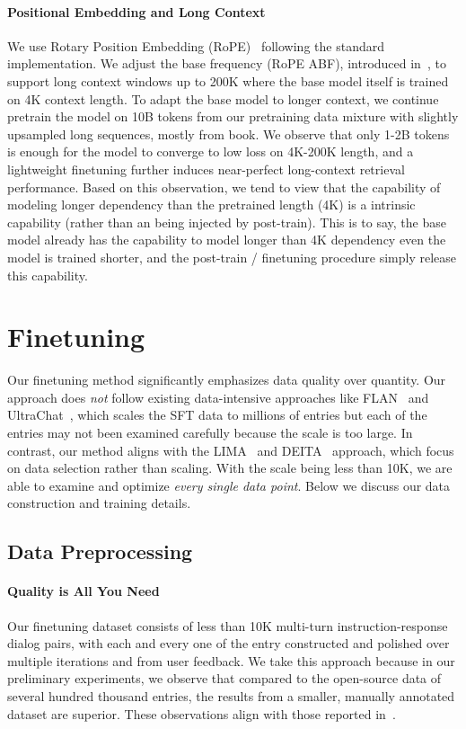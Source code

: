 \documentclass[numbers,sort&compress]{article}
\begin{document}
\paragraph{Positional Embedding and Long Context}

We use Rotary Position Embedding 
 (RoPE)~\citep{su2021roformer} following the standard implementation.
We adjust the base frequency (RoPE ABF), introduced in~\citet{xiong2023effective}, to support long context windows up to 200K where the base model itself is trained on 4K context length. 
To adapt the base model to longer context, we continue pretrain the model on 10B tokens from our pretraining data mixture with slightly upsampled long sequences, mostly from book. 
We observe that only 1-2B tokens is enough for the model to converge to low loss on 4K-200K length, and a lightweight finetuning further induces near-perfect long-context retrieval performance. 
Based on this observation, we tend to view that the capability of modeling longer dependency than the pretrained length (4K) is a intrinsic capability (rather than an being injected by post-train).
This is to say, the base model already has the capability to model longer than 4K dependency even the model is trained shorter, and the post-train / finetuning procedure simply release this capability.

\section{Finetuning}
\label{sec:finetuning}

Our finetuning method significantly emphasizes data quality over quantity.
Our approach does \textit{not} follow existing data-intensive approaches like FLAN~\citep{chung2022scaling} and UltraChat~\citep{ding2023enhancing}, which scales the SFT data to millions of entries but each of the entries may not been examined carefully because the scale is too large.
In contrast, our method aligns with the LIMA~\citep{zhou2023lima} and DEITA~\citep{liu2023makes} approach, which focus on data selection rather than scaling. 
With the scale being less than 10K, we are able to examine and optimize \textit{every single data point}. 
Below we discuss our data construction and training details. 

\subsection{Data Preprocessing}

\paragraph{Quality is All You Need}
Our finetuning dataset consists of less than 10K multi-turn instruction-response dialog pairs, with each and every one of the entry constructed and polished over multiple iterations and from user feedback.
We take this approach because  in our preliminary experiments, we observe that compared to the open-source data of several hundred thousand entries, the results from a smaller, manually annotated dataset are superior.
These observations align with those reported in~\citet{llama2, zhou2023lima, team2023gemini}. 
\end{document}
